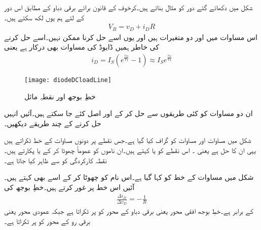 شکل   میں دکھائے گئے دور کو مثال بناتے ہیں۔کرخوف کے قانون برائے برقی دباو کے مطابق اس دور کے لئے ہم یوں لکھ سکتے ہیں۔
\begin{align} \label{مساوات_ڈایوڈ_بار_کا_خط}
V_B=v_D+i_D R
\end{align}
اس مساوات میں  اور  دو متغیرات ہیں اور یوں اسے حل کرنا ممکن نہیں۔اسے حل کرنے کی خاطر ہمیں ڈایوڈ کی مساوات بھی درکار ہے یعنی
\begin{align} \label{مساوات_ڈایوڈ_کا_خط_جس_پر_بار_لدا_جائے}
i_D=I_S \left (e^{\frac{v_D}{V_T}}-1 \right ) \approx I_S e^{\frac{v_S}{V_T}}
\end{align}
%
\begin{figure}
\centering
\texttt{[image: diodeDCloadLine]}
\caption{ خطِ بوجھ اور نقطہِ مائل}
\label{شکل_ڈایوڈ_بار_کا_خط}
\end{figure}
	ان دو مساوات کو کئی طریقوں سے حل کر کے  اور  اصل کئے جا سکتے ہیں۔آئیں انہیں حل کرنے کے چند طریقے دیکھیں۔

شکل  میں مساوات   اور مساوات   کو گراف کیا گیا ہے۔جس نقطے پر دونوں مساوات کے خط ٹکراتے ہیں یہی ان کا حل ہے یعنی ۔ اس نقطے کو  یا   کہتے ہیں۔ان ناموں کو عموماً چھوٹا کر کے  یا  پکارتے ہیں۔نقطہ کارکردگی کو  سے ظاہر کیا جاتا ہے۔

شکل  میں مساوات   کے خط کو  کہا گیا ہے۔اس نام کو چھوٹا کر کے اسے   بھی کہتے ہیں۔آئیں اس خط پر غور کرتے ہیں۔خطِ بوجھ کی 
\begin{align*}
\frac{\Delta i_D}{\Delta v_D}=-\frac{1}{R}
\end{align*}
کے برابر ہے۔خطِ بوجھ افقی محور یعنی برقی دباو  کے محور کو  پر ٹکراتا ہے جبکہ عمودی محور یعنی برقی رو  کے محور کو   پر ٹکراتا ہے۔


